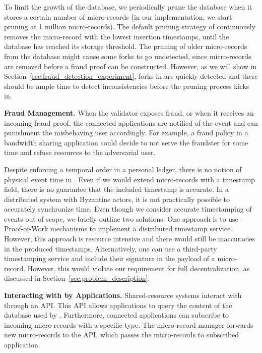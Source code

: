 To limit the growth of the database, we periodically prune the database when it stores a certain number of micro-records (in our implementation, we start pruning at 1 million micro-records).
The default pruning strategy of \ModelName{} continuously removes the micro-record with the lowest insertion timestamps, until the database has reached its storage threshold.
The pruning of older micro-records from the database might cause some forks to go undetected, since micro-records are removed before a fraud proof can be constructed.
However, as we will show in Section~\ref{sec:fraud_detection_experiment}, forks in \ModelName{} are quickly detected and there should be ample time to detect inconsistencies before the pruning process kicks in.

\textbf{Fraud Management.}
When the validator exposes fraud, or when it receives an incoming fraud proof, the connected applications are notified of the event and can punishment the misbehaving user accordingly.
For example, a fraud policy in a bandwidth sharing application could decide to not serve the fraudster for some time and refuse resources to the adversarial user.

Despite enforcing a temporal order in a personal ledger, there is no notion of physical event time in \ModelName{}.
Even if we would extend micro-records with a timestamp field, there is no guarantee that the included timestamp is accurate.
In a distributed system with Byzantine actors, it is not practically possible to accurately synchronize time.
Even though we consider accurate timestamping of events out of scope, we briefly outline two solutions.
One approach is to use Proof-of-Work mechanisms to implement a distributed timestamp service.
However, this approach is resource intensive and there would still be inaccuracies in the produced timestamps.
Alternatively, one can use a third-party timestamping service and include their signature in the payload of a micro-record.
However, this would violate our requirement for full decentralization, as discussed in Section~\ref{sec:problem_description}.

\textbf{Interacting with \ModelName{} by Applications.}
Shared-resource systems interact with \ModelName{} through an API.
This API allows applications to query the content of the database used by \ModelName{}.
Furthermore, connected applications can subscribe to incoming micro-records with a specific type.
The micro-record manager forwards new micro-records to the API, which passes the micro-records to subscribed application.

